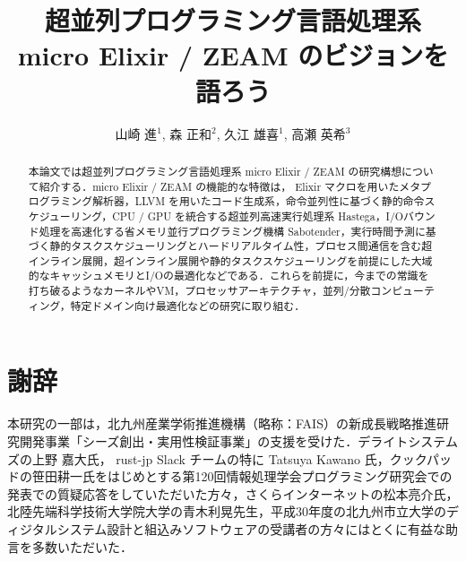 \documentclass[japanese]{jssst_ppl}
\title{超並列プログラミング言語処理系 micro Elixir / ZEAM のビジョンを語ろう}
\author{山崎 進$^1$, 森 正和$^2$, 久江 雄喜$^1$, 高瀬 英希$^3$}
\begin{document}
\maketitle

\begin{abstract}
本論文では超並列プログラミング言語処理系 micro Elixir / ZEAM の研究構想について紹介する．micro Elixir / ZEAM の機能的な特徴は， Elixir マクロを用いたメタプログラミング解析器，LLVM を用いたコード生成系，命令並列性に基づく静的命令スケジューリング，CPU / GPU を統合する超並列高速実行処理系 Hastega，I/Oバウンド処理を高速化する省メモリ並行プログラミング機構 Sabotender，実行時間予測に基づく静的タスクスケジューリングとハードリアルタイム性，プロセス間通信を含む超インライン展開，超インライン展開や静的タスクスケジューリングを前提にした大域的なキャッシュメモリとI/Oの最適化などである．これらを前提に，今までの常識を打ち破るようなカーネルやVM，プロセッサアーキテクチャ，並列/分散コンピューティング，特定ドメイン向け最適化などの研究に取り組む．
\end{abstract}



\section*{謝辞}

本研究の一部は，北九州産業学術推進機構（略称：FAIS）の新成長戦略推進研究開発事業「シーズ創出・実用性検証事業」の支援を受けた．デライトシステムズの上野 嘉大氏， rust-jp Slack チームの特に Tatsuya Kawano 氏，クックパッドの笹田耕一氏をはじめとする第120回情報処理学会プログラミング研究会での発表\cite{ZACKY18J}での質疑応答をしていただいた方々，さくらインターネットの松本亮介氏，北陸先端科学技術大学院大学の青木利晃先生，平成30年度の北九州市立大学のディジタルシステム設計と組込みソフトウェアの受講者の方々にはとくに有益な助言を多数いただいた．




\end{document}
